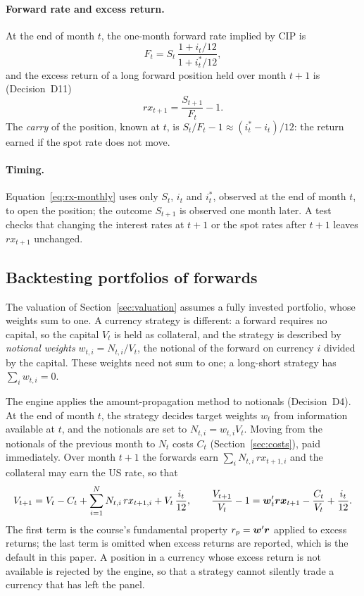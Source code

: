 \paragraph{Forward rate and excess return.}
At the end of month $t$, the one-month forward rate implied by CIP is
\begin{equation}\label{eq:fwd-monthly}
  F_t = S_t \, \frac{1 + i_t/12}{1 + i^*_t/12},
\end{equation}
and the excess return of a long forward position held over month $t+1$ is (Decision~D11)
\begin{equation}\label{eq:rx-monthly}
  rx_{t+1} = \frac{S_{t+1}}{F_t} - 1.
\end{equation}
The \emph{carry} of the position, known at $t$, is $S_t/F_t - 1 \approx (i_t^* - i_t)/12$: the return earned if the spot rate does not move.

\paragraph{Timing.}
Equation~\eqref{eq:rx-monthly} uses only $S_t$, $i_t$ and $i^*_t$, observed at the end of month $t$, to open the position; the outcome $S_{t+1}$ is observed one month later.
A test checks that changing the interest rates at $t+1$ or the spot rates after $t+1$ leaves $rx_{t+1}$ unchanged.

\subsection{Backtesting portfolios of forwards}\label{sec:fwd-backtest}

The valuation of Section~\ref{sec:valuation} assumes a fully invested portfolio, whose weights sum to one.
A currency strategy is different: a forward requires no capital, so the capital $V_t$ is held as collateral, and the strategy is described by \emph{notional weights} $w_{t,i} = N_{t,i}/V_t$, the notional of the forward on currency $i$ divided by the capital.
These weights need not sum to one; a long-short strategy has $\sum_i w_{t,i} = 0$.

The engine applies the amount-propagation method to notionals (Decision~D4).
At the end of month $t$, the strategy decides target weights $w_t$ from information available at $t$, and the notionals are set to $N_{t,i} = w_{t,i} V_t$.
Moving from the notionals of the previous month to $N_t$ costs $C_t$ (Section~\ref{sec:costs}), paid immediately.
Over month $t+1$ the forwards earn $\sum_i N_{t,i}\, rx_{t+1,i}$ and the collateral may earn the US rate, so that
\begin{equation}\label{eq:fwd-value}
  V_{t+1} = V_t - C_t + \sum_{i=1}^N N_{t,i}\, rx_{t+1,i} + V_t\,\frac{i_t}{12},
  \qquad
  \frac{V_{t+1}}{V_t} - 1 = \boldsymbol{w}_t'\boldsymbol{rx}_{t+1} - \frac{C_t}{V_t} + \frac{i_t}{12}.
\end{equation}
The first term is the course's fundamental property $r_p = \boldsymbol{w}'\boldsymbol{r}$ applied to excess returns; the last term is omitted when excess returns are reported, which is the default in this paper.
A position in a currency whose excess return is not available is rejected by the engine, so that a strategy cannot silently trade a currency that has left the panel.


